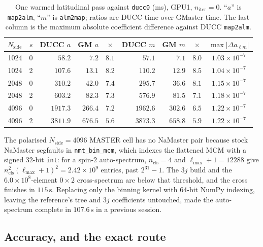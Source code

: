 \documentclass[usenatbib,useAMS]{mnras}
\begin{document}
\begin{table}
\centering
\caption{One warmed latitudinal pass against \texttt{ducc0} (ms), GPU1, $n_{\mathrm{iter}}=0$. ``$a$'' is \texttt{map2alm}, ``$m$'' is \texttt{alm2map}; ratios are DUCC time over GMaster time. The last column is the maximum absolute coefficient difference against DUCC \texttt{map2alm}.}
\label{tab:sht}
\footnotesize
\setlength{\tabcolsep}{2.5pt}
\begin{tabular}{@{}rrrrcrrcc@{}}
\toprule
$N_{\mathrm{side}}$ & $s$ & DUCC $a$ & GM $a$ & $\times$ & DUCC $m$ & GM $m$ & $\times$ & $\max\lvert\Delta a_{\ell m}\rvert$ \\
\midrule
1024 & 0 & $58.2$   & $7.2$   & $8.1$ & $57.1$   & $7.1$   & $8.0$ & $1.03\times10^{-7}$ \\
1024 & 2 & $107.6$  & $13.1$  & $8.2$ & $110.2$  & $12.9$  & $8.5$ & $1.04\times10^{-7}$ \\
2048 & 0 & $310.2$  & $42.0$  & $7.4$ & $295.7$  & $36.6$  & $8.1$ & $1.15\times10^{-7}$ \\
2048 & 2 & $603.2$  & $82.3$  & $7.3$ & $576.9$  & $81.5$  & $7.1$ & $1.18\times10^{-7}$ \\
4096 & 0 & $1917.3$ & $266.4$ & $7.2$ & $1962.6$ & $302.6$ & $6.5$ & $1.22\times10^{-7}$ \\
4096 & 2 & $3811.9$ & $676.5$ & $5.6$ & $3873.3$ & $658.8$ & $5.9$ & $1.22\times10^{-7}$ \\
\bottomrule
\end{tabular}
\end{table}

The polarised $N_{\mathrm{side}}=4096$ MASTER cell has no NaMaster pair because stock NaMaster segfaults in \texttt{nmt\_bin\_mcm}, which indexes the flattened MCM with a signed 32-bit \texttt{int}: for a spin-$2$ auto-spectrum, $n_{\mathrm{cls}}=4$ and $\ell_{\max}+1=12288$ give $n_{\mathrm{cls}}^2(\ell_{\max}+1)^2=2.42\times10^{9}$ entries, past $2^{31}-1$. The $3j$ build and the $6.0\times10^{8}$-element $0\times2$ cross-spectrum are below that threshold, and the cross finishes in $115\,\mathrm{s}$. Replacing only the binning kernel with 64-bit NumPy indexing, leaving the reference's tree and $3j$ coefficients untouched, made the auto-spectrum complete in $107.6\,\mathrm{s}$ in a previous session.

\subsection{Accuracy, and the exact route}
\end{document}
